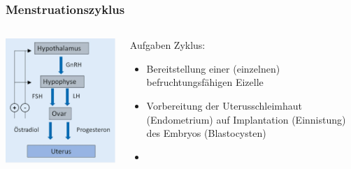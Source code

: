 \documentclass{beamer}
\begin{document}
\begin{frame}
\frametitle{Menstruationszyklus}

\begin{columns}[c]

\begin{column}{4cm}

\begin{center}
\includegraphics[width=\textwidth]{hypothalamus_hypophyse_ovar.png}
\end{center}

\end{column}

\begin{column}{7cm}

\pause

\begin{block}{Aufgaben Zyklus:}
\begin{itemize}
\item
 
 Bereitstellung einer (einzelnen) befruchtungsfähigen Eizelle
\item
 Vorbereitung der Uterusschleimhaut (Endometrium) auf Implantation (Einnistung) des Embryos (Blastocysten)
\item


\end{itemize}
\end{block}
\end{column}
\end{columns}
\end{frame}
\end{document}
